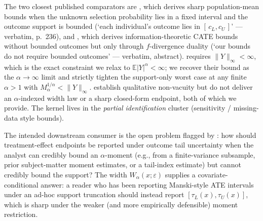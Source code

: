 \documentclass[11pt]{article}
\newcommand{\E}{\mathbb{E}}
\theoremstyle{definition}
\theoremstyle{plain}
\theoremstyle{remark}
\begin{document}
The two closest published comparators are \citet[Theorem~1, eqn.~(2), p.~236]{AronowLee2013},
which derives sharp population-mean bounds when the unknown selection probability lies
in a fixed interval and the outcome support is bounded (`each individual's outcome lies in
$[\,c_L, c_U\,]$' --- verbatim, p.~236), and \citet[Theorem~3.1]{JungKang2026ITBounds},
which derives information-theoretic CATE bounds without bounded outcomes but only through
$f$-divergence duality (`our bounds do not require bounded outcomes' --- verbatim, abstract).
\citet{AronowLee2013} requires $\|Y\|_\infty < \infty$, which is the exact constraint we
relax to $\E|Y|^\alpha < \infty$; we recover their bound as the $\alpha\to\infty$
limit and strictly tighten the support-only worst case at any finite $\alpha>1$ with
$M_\alpha^{1/\alpha} < \|Y\|_\infty$. \citet{JungKang2026ITBounds} establish
qualitative non-vacuity but do not deliver an $\alpha$-indexed width law or a sharp
closed-form endpoint, both of which we provide. The kernel lives in the
\emph{partial identification} cluster (sensitivity / missing-data style bounds).

The intended downstream consumer is the open problem flagged by
\citet{LordanSalehzadehNobari2026TailUncertainty}: how should treatment-effect
endpoints be reported under outcome tail uncertainty when the analyst can credibly
bound an $\alpha$-moment (e.g., from a finite-variance subsample, prior subject-matter
moment estimates, or a tail-index estimate) but cannot credibly bound the support?
The width $W_\alpha(x;\varepsilon)$ supplies a covariate-conditional answer:
a reader who has been reporting Manski-style ATE intervals under an ad-hoc support
truncation should instead report $[\tau_L(x),\tau_U(x)]$, which is sharp under the
weaker (and more empirically defensible) moment restriction.
\end{document}
